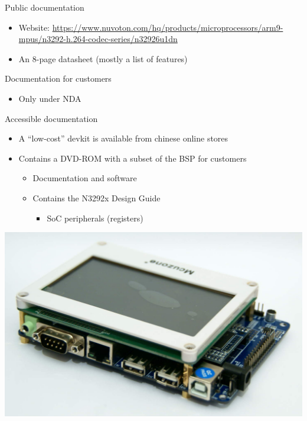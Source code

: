 \documentclass[xetex,table]{beamer}
\begin{document}
\begin{frame}{Public documentation}
  \begin{itemize}
  \item Website:{\tiny
    \url{https://www.nuvoton.com/hq/products/microprocessors/arm9-mpus/n3292-h.264-codec-series/n32926u1dn}}
  \item An 8-page datasheet (mostly a list of features)
  \end{itemize}
\end{frame}

\begin{frame}{Documentation for customers}
  \begin{itemize}
  \item Only under NDA
  \end{itemize}
\end{frame}

\begin{frame}{Accessible documentation}
  \begin{itemize}
  \item A ``low-cost'' devkit is available from chinese online stores
  \item Contains a DVD-ROM with a subset of the BSP for customers
    \begin{itemize}
    \item Documentation and software
    \item Contains the N3292x Design Guide
      \begin{itemize}
      \item SoC peripherals (registers)
      \end{itemize}
    \end{itemize}
  \end{itemize}
  \begin{center}
    \includegraphics[height=0.4\textheight]{images/devkit.jpg}
  \end{center}
\end{frame}
\end{document}

